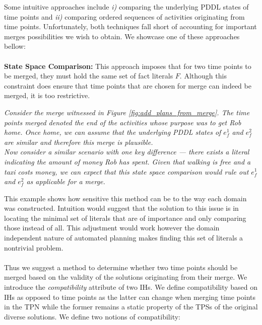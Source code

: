 Some intuitive approaches include \textit{i)} comparing the underlying PDDL states of time points and \textit{ii)} comparing ordered sequences of activities originating from time points.
Unfortunately, both techniques fall short of accounting for important merges possibilities we wish to obtain. We showcase one of these approaches bellow:\\
\\
\textbf{State Space Comparison:} This approach imposes that for two time points to be merged, they must hold the same set of fact literals $F$. Although this constraint does ensure that time points that are chosen for merge can indeed be merged, it is too restrictive.\\
\begin{tcolorbox}[colback=red!5!white,colframe=red!75!black]
  \textit{Consider the merge witnessed in Figure \ref{fig:add_plans_from_merge}. The time points merged denoted the end of the activities whose purpose was to get Rob home. Once home, we can assume that the underlying PDDL states of $e^1_f$ and $e^2_f$ are similar and therefore this merge is plausible.\\
  Now consider a similar scenario with one key difference --- there exists a literal indicating the amount of money Rob has spent.
  Given that walking is free and a taxi costs money, we can expect that this state space comparison would rule out $e^1_f$ and $e^2_f$ as applicable for a merge.
    }
\end{tcolorbox}
This example shows how sensitive this method can be to the way each domain was constructed. 
Intuition would suggest that the solution to this issue is in locating the minimal set of literals that are of importance and only comparing those instead of all. This adjustment would work however the domain independent nature of automated planning makes finding this set of literals a nontrivial problem.
\\ \\
Thus we suggest a method to determine whether two time points should be merged based on the validity of the solutions originating from their merge.
We introduce the {\em compatibility} attribute of two IHs. We define compatibility based on IHs as opposed to time points as the latter can change when merging time points in the TPN while the former remains a static property of the TPSs of the original diverse solutions.
We define two notions of compatibility:
